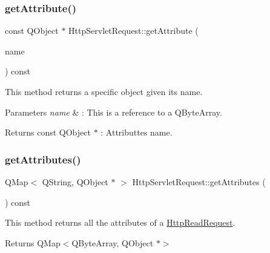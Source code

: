 \subsubsection{\texorpdfstring{get\+Attribute()}{getAttribute()}}
{\footnotesize\ttfamily const Q\+Object $\ast$ Http\+Servlet\+Request\+::get\+Attribute (\begin{DoxyParamCaption}\item[{const Q\+String \&}]{name }\end{DoxyParamCaption}) const}



This method returns a specific object given its name. 


\begin{DoxyParams}{Parameters}
{\em name} & \+: This is a reference to a Q\+Byte\+Array. \\
\hline
\end{DoxyParams}
\begin{DoxyReturn}{Returns}
const Q\+Object $\ast$ \+: Attributte\textquotesingle{}s name. 
\end{DoxyReturn}
\mbox{\label{class_http_servlet_request_add50206d719a748a2162610fd30f060e}} 
\subsubsection{\texorpdfstring{get\+Attributes()}{getAttributes()}}
{\footnotesize\ttfamily Q\+Map$<$ Q\+String, Q\+Object $\ast$ $>$ Http\+Servlet\+Request\+::get\+Attributes (\begin{DoxyParamCaption}{ }\end{DoxyParamCaption}) const}



This method returns all the attributes of a \mbox{\hyperlink{class_http_read_request}{Http\+Read\+Request}}. 

\begin{DoxyReturn}{Returns}
Q\+Map$<$\+Q\+Byte\+Array, Q\+Object $\ast$$>$ 
\end{DoxyReturn}
\mbox{\label{class_http_servlet_request_a8c20ab8bd4ce24c33500b333b301e960}} 
